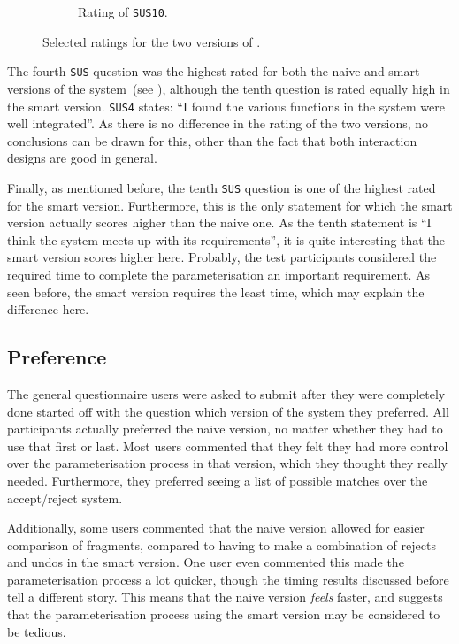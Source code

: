 \begin{figure}[h!]
\begin{subfigure}[t]{0.32\textwidth}
\caption{Rating of \texttt{SUS10}.}
\end{subfigure}
\caption{Selected ratings for the two versions of \oframp.}
\end{figure}

The fourth \verb|SUS| question was the highest rated for both the naive and smart versions of the system~(see ), although the tenth question is rated equally high in the smart version. \verb|SUS4| states: ``I found the various functions in the system were well integrated''. As there is no difference in the rating of the two versions, no conclusions can be drawn for this, other than the fact that both interaction designs are good in general.

Finally, as mentioned before, the tenth \verb|SUS| question is one of the highest rated for the smart version. Furthermore, this is the only statement for which the smart version actually scores higher than the naive one. As the tenth statement is ``I think the system meets up with its requirements'', it is quite interesting that the smart version scores higher here. Probably, the test participants considered the required time to complete the parameterisation an important requirement. As seen before, the smart version requires the least time, which may explain the difference here.


\subsection{Preference}
The general questionnaire users were asked to submit after they were completely done started off with the question which version of the system they preferred. All participants actually preferred the naive version, no matter whether they had to use that first or last. Most users commented that they felt they had more control over the parameterisation process in that version, which they thought they really needed. Furthermore, they preferred seeing a list of possible matches over the accept/reject system.

Additionally, some users commented that the naive version allowed for easier comparison of fragments, compared to having to make a combination of rejects and undos in the smart version. One user even commented this made the parameterisation process a lot quicker, though the timing results discussed before tell a different story. This means that the naive version \emph{feels} faster, and suggests that the parameterisation process using the smart version may be considered to be tedious.

